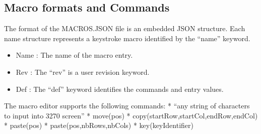 \documentclass[letterpaper,10pt,english]{sphinxmanual}
\begin{document}
\ignorespaces 

\subsection{Macro formats and Commands}
\label{\detokenize{Customization:macro-formats-and-commands}}\label{\detokenize{Customization:index-93}}
\sphinxAtStartPar
The format of the MACROS.JSON file is an embedded JSON structure. Each name structure represents a keystroke macro identified by the “name” keyword.
\begin{itemize}
\item {} 
\sphinxAtStartPar
Name : The name of the macro entry.

\item {} 
\sphinxAtStartPar
Rev : The “rev” is a user revision keyword.

\item {} 
\sphinxAtStartPar
Def : The “def” keyword identifies the commands and entry values.

\end{itemize}

\sphinxAtStartPar
The macro editor supports the following commands:\sphinxhyphen{}
*   “any string of characters to input into 3270 screen”
*   move(pos)
*   copy(startRow,startCol,endRow,endCol)
*   paste(pos)
*   paste(pos,nbRows,nbCols)
*   key(keyIdentifier)

\sphinxAtStartPar
{}
\end{document}
